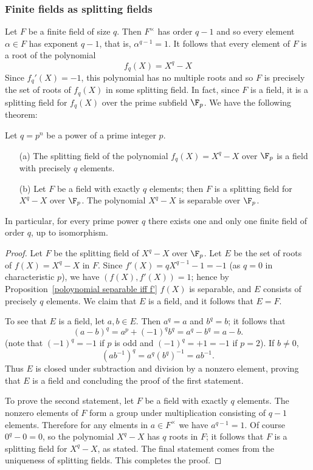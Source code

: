 \subsubsection{Finite fields as splitting fields}
Let $F$ be a finite field of size $q$. Then $F^\times$ has order $q-1$ and so every element $\alpha\in F$ has exponent $q-1$, that is, $\alpha^{q-1}=1$. It follows that every element of $F$ is a root of the polynomial
\[f_q(X)=X^q-X\]
Since $f_q'(X)=-1$, this polynomial has no multiple roots and so $F$ is precisely the set of roots of $f_q(X)$ in some splitting field. In fact, since $F$ is a field, it is a splitting field for $f_q(X)$ over the prime subfield $\F_p$. We have the following theorem:
\begin{theorem}\label{finite field p^n order extension char}
Let $q=p^n$ be a power of a prime integer $p$.
\begin{itemize}
\item[(a)] The splitting field of the polynomial $f_q(X)=X^{q}-X$ over $\F_p$ is a field with precisely $q$ elements.
\item[(b)] Let $F$ be a field with exactly $q$ elements; then $F$ is a splitting field for $X^q-X$ over $\F_p$. The polynomial $X^q-X$ is separable over $\F_p$.
\end{itemize}
In particular, for every prime power $q$ there exists one and only one finite field of order $q$, up to isomorphism.
\end{theorem}
\begin{proof}
Let $F$ be the splitting field of $X^q-X$ over $\F_p$. Let $E$ be the set of roots of $f(X)=X^q-X$ in $F$. Since $f'(X)=qX^{q-1}-1=-1$ (as $q=0$ in characteristic $p$), we have $(f(X),f'(X))=1$; hence by Proposition~\ref{poloynomial separable iff f'} $f(X)$ is separable, and $E$ consists of precisely $q$ elements. We claim that $E$ is a field, and it follows that $E=F$.\par
To see that $E$ is a field, let $a,b\in E$. Then $a^q=a$ and $b^q=b$; it follows that
\[(a-b)^q=a^p+(-1)^qb^q=a^q-b^q=a-b.\]
(note that $(-1)^q=-1$ if $p$ is odd and $(-1)^q=+1=-1$ if $p=2$). If $b\neq0$,
\[(ab^{-1})^q=a^q(b^q)^{-1}=ab^{-1}.\]
Thus $E$ is closed under subtraction and division by a nonzero element, proving that $E$ is a field and concluding the proof of the first statement.\par
To prove the second statement, let $F$ be a field with exactly $q$ elements. The nonzero elements of $F$ form a group under multiplication consisting of $q-1$ elements. Therefore for any elments in $a\in F^\times$ we have $a^{q-1}=1$. Of course $0^q-0=0$, so the polynomial $X^q-X$ has $q$ roots in $F$; it follows that $F$ is a splitting field for $X^q-X$, as stated. The final statement comes from the uniqueness of splitting fields. This completes the proof.
\end{proof}
